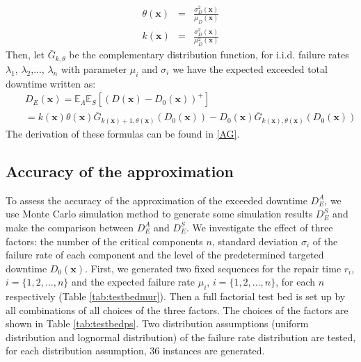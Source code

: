 \documentclass[preprint,12pt]{elsarticle}
\begin{document}
\begin{eqnarray}
 \theta(\boldsymbol{x}) &=& \frac{\sigma^{2}_{D}(\boldsymbol{x})}{\mu_{D}(\boldsymbol{x})}\\
 k(\boldsymbol{x}) &=& \frac{\sigma^{2}_{D}(\boldsymbol{x})}{\mu^{2}_{D}(\boldsymbol{x})}
\end{eqnarray}
 Then, let $\bar{G}_{k,\theta}$ be the complementary distribution function, for i.i.d. failure rates $\lambda_{1}$, $\lambda_{2}$,..., $\lambda_{n}$ with parameter $\mu_{i}$ and $\sigma_{i}$ we have the expected exceeded total downtime written as:
\begin{eqnarray}
&&D_{E}(\boldsymbol{x})=\mathbb{E}_{\Lambda}\mathbb{E}_{S}{[(D(\boldsymbol{x})-D_{0}(\boldsymbol{x}))^{+}]} \nonumber\\
&&=k(\boldsymbol{x})\theta(\boldsymbol{x}) \bar{G}_{k(\boldsymbol{x})+1,\theta(\boldsymbol{x})}(D_{0}(\boldsymbol{x})) -D_{0}(\boldsymbol{x})\bar{G}_{k(\boldsymbol{x}),\theta(\boldsymbol{x})}(D_{0}(\boldsymbol{x}))
\label{EXD}
\end{eqnarray}
The derivation of these formulas can be found in \ref{AG}.


\subsection{Accuracy of the approximation}
To assess the accuracy of the approximation of the exceeded downtime $D_{E}^{A}$, we use Monte Carlo simulation method to generate some simulation results $D_{E}^{S}$ and make the comparison between $D_{E}^{A}$ and $D_{E}^{S}$. We investigate the effect of three factors: the number of the critical components $n$, standard deviation $\sigma_{i}$ of the failure rate of each component and the level of the predetermined targeted downtime $D_{0}(\boldsymbol{x})$. First, we generated two fixed sequences for the repair time $r_{i}$, $i=\{1,2,...,n\}$ and the expected failure rate $\mu_{i}$, $i=\{1,2,...,n\}$, for each $n$ respectively (Table \ref{tab:testbedmur}). Then a full factorial test bed is set up by all combinations of all choices of the three factors. The choices of the factors are shown in Table \ref{tab:testbedps}. Two distribution assumptions (uniform distribution and lognormal distribution) of the failure rate distribution are tested, for each distribution assumption, 36 instances are generated.
\end{document}

